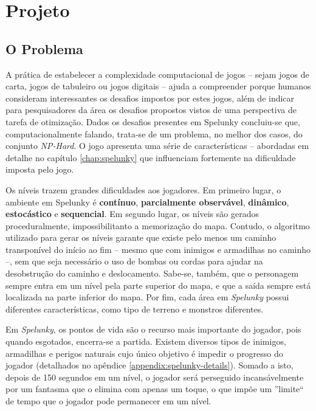 \chapter{\label{chap:project}Projeto}


\section{\label{section:problem}O Problema}
A prática de estabelecer a complexidade computacional de jogos -- sejam jogos de
carta, jogos de tabuleiro ou jogos digitais -- ajuda a compreender  porque
humanos consideram interessantes os desafios impostos por estes jogos, além de
indicar para pesquisadores da área os desafios propostos vistos de uma
perspectiva de tarefa de otimização.  Dados os desafios presentes em Spelunky
concluiu-se que, computacionalmente falando, trata-se de um problema, no melhor
dos casos, do conjunto \textit{NP-Hard}\cite{SPELUNKYHARD}. O jogo apresenta uma
série de características -- abordadas em detalhe no capítulo \ref{chap:spelunky}
que influenciam fortemente na dificuldade imposta pelo jogo.

Os níveis trazem grandes dificuldades aos jogadores. Em primeiro lugar, o
ambiente em Spelunky é \textbf{contínuo}, \textbf{parcialmente observável},
\textbf{dinâmico}, \textbf{estocástico} e \textbf{sequencial}. Em segundo
lugar, os níveis são gerados proceduralmente, impossibilitanto a memorização do
mapa.  Contudo, o algoritmo utilizado para gerar os níveis garante que existe
pelo menos um caminho transponível do início ao fim -- mesmo que com inimigos e
armadilhas no caminho --, sem que seja necessário o uso de bombas ou cordas
para ajudar na desobstrução do caminho e deslocamento. Sabe-se, também, que o
personagem sempre entra em um nível pela parte superior do mapa, e que a saída
sempre está localizada na parte inferior do mapa. Por fim, cada área em
\textit{Spelunky} possui diferentes características, como tipo de terreno e
monstros diferentes.

Em \textit{Spelunky}, os pontos de vida são o recurso mais importante do
jogador, pois quando esgotados, encerra-se a partida. Existem diversos tipos de
inimigos, armadilhas e perigos naturais cujo único objetivo é impedir o
progresso do jogador (detalhados no apêndice \ref{appendix:spelunky-details}).
Somado a isto, depois de 150 segundos em um nível, o jogador será perseguido
incansávelmente por um fantasma que o elimina com apenas um toque, o que impõe
um ''limite`` de tempo que o jogador pode permanecer em um nível.

